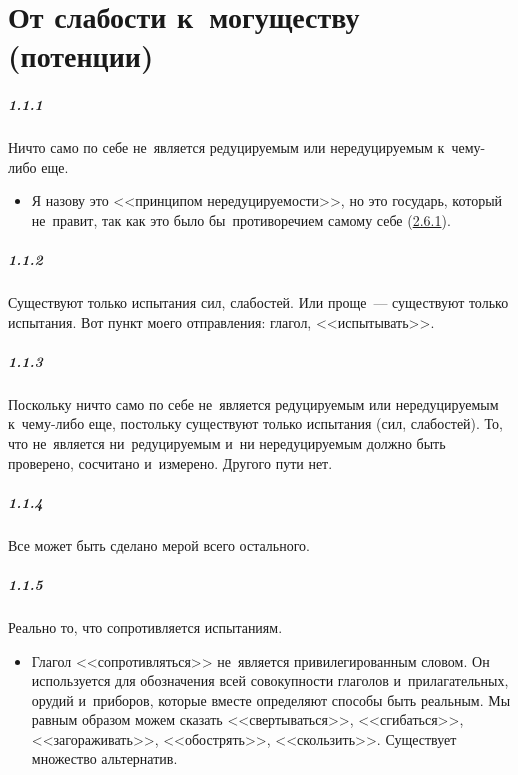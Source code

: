 \chapter{От слабости к~могуществу (потенции)}\hypertarget{chap1}{}

\paragraph{1.1.1}\hypertarget{par:1.1.1}{} Ничто само по себе не~является редуцируемым или нередуцируемым к~чему-либо еще. 
	\begin{itemize}
	\item {Я назову это <<принципом нередуцируемости>>, но это государь, который не~правит, так как это было бы~противоречием самому себе (\hyperlink{par:2.6.1}{2.6.1})}.
	\end{itemize}

\paragraph{1.1.2}\hypertarget{par:1.1.2}{} Существуют только испытания сил, слабостей. Или проще~--- существуют только испытания. Вот пункт моего отправления: глагол, <<испытывать>>.

\paragraph{1.1.3}\hypertarget{par:1.1.3}{} Поскольку ничто само по себе не~является редуцируемым или нередуцируемым к~чему-либо еще, постольку существуют только испытания (сил, слабостей). То, что не~является ни~редуцируемым и~ни нередуцируемым должно быть проверено, сосчитано и~измерено. Другого пути нет.

\paragraph{1.1.4}\hypertarget{par:1.1.4}{} Все может быть сделано мерой всего остального.

\paragraph{1.1.5}\hypertarget{par:1.1.5}{} Реально то, что сопротивляется испытаниям.
	\begin{itemize}
	\item Глагол <<сопротивляться>> не~является привилегированным словом. Он используется для обозначения всей совокупности глаголов и~прилагательных, орудий и~приборов, которые вместе определяют способы быть реальным. Мы равным образом можем сказать <<свертываться>>, <<сгибаться>>, <<загораживать>>, <<обострять>>, <<скользить>>. Существует множество альтернатив.
	\end{itemize}

